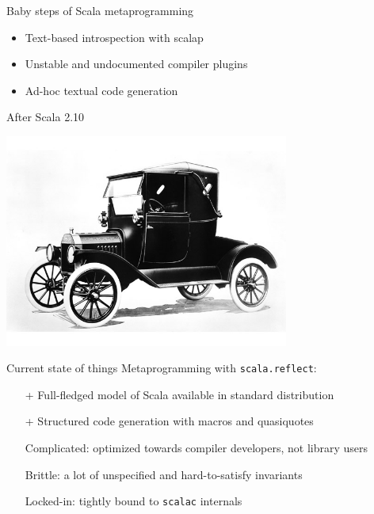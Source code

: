 \documentclass[svgnames,dvipsnames,hyperref={bookmarks=false},usepdftitle=false]{beamer}
\begin{document}
\begin{frame}{Baby steps of Scala metaprogramming}
\begin{itemize}
\item Text-based introspection with scalap
\item Unstable and undocumented compiler plugins
\item Ad-hoc textual code generation
\end{itemize}
\end{frame}

\begin{frame}[c, fragile]{After Scala 2.10}
\begin{center}
\includegraphics[height=7cm]{car.jpg}
\end{center}
\end{frame}

\begin{frame}{Current state of things}
Metaprogramming with \texttt{scala.reflect}:
\begin{itemize}
\item[+] Full-fledged model of Scala available in standard distribution
\item[+] Structured code generation with macros and quasiquotes
\end{itemize}
\pause
\begin{itemize}
\item[\textendash] Complicated: optimized towards compiler developers, not library users
\item[\textendash] Brittle: a lot of unspecified and hard-to-satisfy invariants
\item[\textendash] Locked-in: tightly bound to \texttt{scalac} internals
\end{itemize}
\end{frame}
\end{document}
